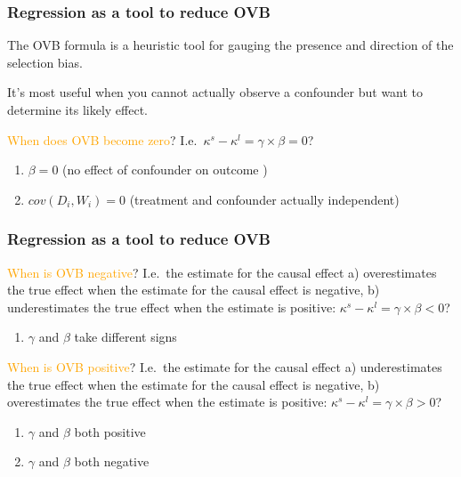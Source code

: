 \documentclass[12pt,english,dvipsnames,aspectratio=169,handout]{beamer}\usepackage[]{graphicx}\usepackage[]{xcolor}
\begin{document}
\begin{frame}
\frametitle{Regression as a tool to reduce OVB}

The OVB formula is a heuristic tool for gauging the presence and direction of the selection bias. 

It's most useful when you cannot actually observe a confounder but want to determine its likely effect.

\footnotesize
\vspace{5mm}
\textcolor{orange}{When does OVB become zero}? I.e.\ $\kappa^s - \kappa^l  = \gamma \times \beta = 0$?

\begin{enumerate}
  \item $\beta=0$ (\footnotesize no effect of confounder on outcome \normalsize)
  \item $cov(D_i, W_i)=0$ (\footnotesize treatment and confounder actually independent\normalsize)
\end{enumerate}

\end{frame}


\begin{frame}
\frametitle{Regression as a tool to reduce OVB}

\footnotesize
\textcolor{orange}{When is OVB negative}? I.e.\ the estimate for the causal effect a) overestimates the true effect when the estimate for the causal effect is negative, b) underestimates the true effect when the estimate is positive: $\kappa^s - \kappa^l  = \gamma \times \beta < 0$? 

\begin{enumerate}
  \item $\gamma$ and $\beta$ take different signs 
\end{enumerate}

\textcolor{orange}{When is OVB positive}? I.e.\ the estimate for the causal effect a) underestimates the true effect when the estimate for the causal effect is negative, b) overestimates the true effect when the estimate is positive: $\kappa^s - \kappa^l  = \gamma \times \beta > 0$?

\begin{enumerate}
  \item $\gamma$ and $\beta$ both positive  
  \item $\gamma$ and $\beta$ both negative 
\end{enumerate}

\end{frame}
\end{document}
